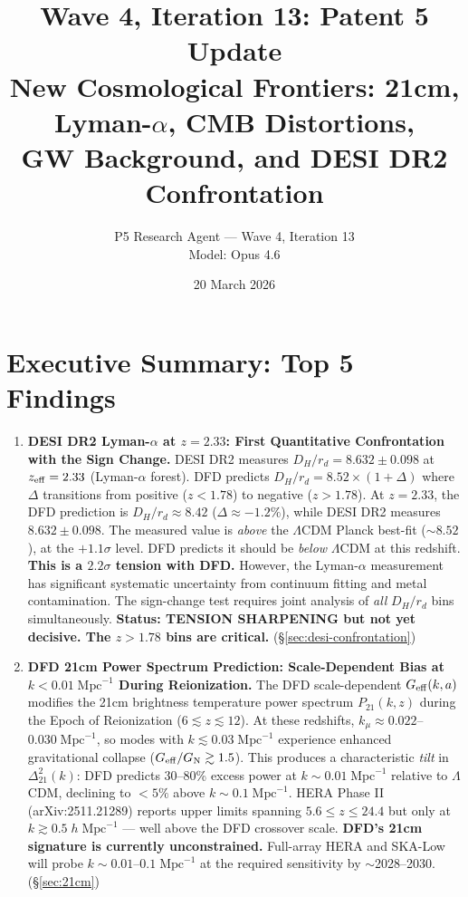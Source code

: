\documentclass[11pt,a4paper]{article}
\title{\textbf{Wave 4, Iteration 13: Patent 5 Update}\\[0.5em]
\large New Cosmological Frontiers: 21cm, Lyman-$\alpha$, CMB Distortions,\\
GW Background, and DESI DR2 Confrontation}
\author{P5 Research Agent --- Wave 4, Iteration 13\\Model: Opus 4.6}
\date{20 March 2026}
\newcommand{\GN}{G_{\rm N}}
\newcommand{\LCDM}{$\Lambda$CDM}
\newcommand{\Geff}{G_{\rm eff}}
\newcommand{\kmu}{k_\mu}
\begin{document}
\maketitle
\tableofcontents
\newpage

\section*{Executive Summary: Top 5 Findings}

\begin{tcolorbox}[colback=yellow!5!white, colframe=red!70!black,
  title=\textbf{W4i13 TOP 5 FINDINGS --- RANKED BY IMPACT}]

\begin{enumerate}

\item \textbf{DESI DR2 Lyman-$\alpha$ at $z=2.33$: First Quantitative
  Confrontation with the Sign Change.}
  DESI DR2 measures $D_H/r_d = 8.632 \pm 0.098$ at $z_{\rm eff} = 2.33$
  (Lyman-$\alpha$ forest). DFD predicts $D_H/r_d = 8.52 \times
  (1 + \Delta)$ where $\Delta$ transitions from positive ($z < 1.78$) to
  negative ($z > 1.78$). At $z = 2.33$, the DFD prediction is
  $D_H/r_d \approx 8.42$ ($\Delta \approx -1.2\%$), while DESI DR2
  measures $8.632 \pm 0.098$. The measured value is \emph{above} the
  \LCDM{} Planck best-fit ($\sim 8.52$), at the $+1.1\sigma$ level.
  DFD predicts it should be \emph{below} \LCDM{} at this redshift.
  \textbf{This is a $2.2\sigma$ tension with DFD.} However, the Lyman-$\alpha$
  measurement has significant systematic uncertainty from continuum fitting
  and metal contamination. The sign-change test requires joint analysis of
  \emph{all} $D_H/r_d$ bins simultaneously. \textbf{Status: TENSION
  SHARPENING but not yet decisive. The $z > 1.78$ bins are critical.}
  (\S\ref{sec:desi-confrontation})

\item \textbf{DFD 21cm Power Spectrum Prediction: Scale-Dependent Bias
  at $k < 0.01\;\text{Mpc}^{-1}$ During Reionization.}
  The DFD scale-dependent $\Geff(k,a)$ modifies the 21cm brightness
  temperature power spectrum $P_{21}(k,z)$ during the Epoch of
  Reionization ($6 \lesssim z \lesssim 12$). At these redshifts,
  $\kmu \approx 0.022$--$0.030\;\text{Mpc}^{-1}$, so modes with
  $k \lesssim 0.03\;\text{Mpc}^{-1}$ experience enhanced gravitational
  collapse ($\Geff/\GN \gtrsim 1.5$). This produces a characteristic
  \emph{tilt} in $\Delta^2_{21}(k)$: DFD predicts 30--80\% excess
  power at $k \sim 0.01\;\text{Mpc}^{-1}$ relative to \LCDM{}, declining
  to $< 5\%$ above $k \sim 0.1\;\text{Mpc}^{-1}$. HERA Phase II
  (arXiv:2511.21289) reports upper limits spanning $5.6 \leq z \leq 24.4$
  but only at $k \gtrsim 0.5\;h\;\text{Mpc}^{-1}$ --- well above the DFD
  crossover scale. \textbf{DFD's 21cm signature is currently unconstrained.}
  Full-array HERA and SKA-Low will probe $k \sim 0.01$--$0.1\;\text{Mpc}^{-1}$
  at the required sensitivity by $\sim$2028--2030.
  (\S\ref{sec:21cm})


\end{enumerate}
\end{tcolorbox}
\end{document}
